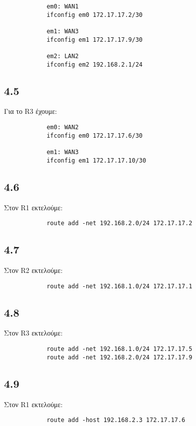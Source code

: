 \documentclass[a4paper, 12pt]{article}
\begin{document}
		\begin{verbatim}
			em0: WAN1
			ifconfig em0 172.17.17.2/30
			
			em1: WAN3
			ifconfig em1 172.17.17.9/30
			
			em2: LAN2
			ifconfig em2 192.168.2.1/24
		\end{verbatim}

	\subsection*{4.5}
		Για το R3 έχουμε:
		
		\begin{verbatim}
			em0: WAN2
			ifconfig em0 172.17.17.6/30
			
			em1: WAN3
			ifconfig em1 172.17.17.10/30
		\end{verbatim}

	\subsection*{4.6}
		Στον R1 εκτελούμε:
		
		\begin{verbatim}
			route add -net 192.168.2.0/24 172.17.17.2
		\end{verbatim}

	\subsection*{4.7}
		Στον R2 εκτελούμε:
		
		\begin{verbatim}
			route add -net 192.168.1.0/24 172.17.17.1
		\end{verbatim}

	\subsection*{4.8}
		Στον R3 εκτελούμε:

		\begin{verbatim}
			route add -net 192.168.1.0/24 172.17.17.5
			route add -net 192.168.2.0/24 172.17.17.9
		\end{verbatim}
	
	\subsection*{4.9}
		Στον R1 εκτελούμε:
		
		\begin{verbatim}
			route add -host 192.168.2.3 172.17.17.6
		\end{verbatim}
		
\end{document}

